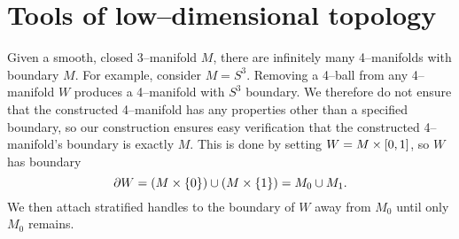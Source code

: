 \chapter{Tools of low--dimensional topology}
\label{chapter:problem}

Given a smooth, closed 3--manifold $M$, there are infinitely many 4--manifolds with boundary $M$.
For example, consider $M=S^3$.
Removing a 4--ball from any 4--manifold $W$ produces a 4--manifold with $S^3$ boundary.
We therefore do not ensure that the constructed 4--manifold has any properties other than a specified boundary, so our construction ensures easy verification that the constructed 4--manifold's boundary is exactly $M$.
This is done by setting $W=M\times [0,1]$, so $W$ has boundary 
\[
	\partial W = (M\times\{0\}) \cup (M\times\{1\}) = M_0 \cup M_1.
\]
We then attach stratified handles to the boundary of $W$ away from $M_0$ until only $M_0$ remains.








